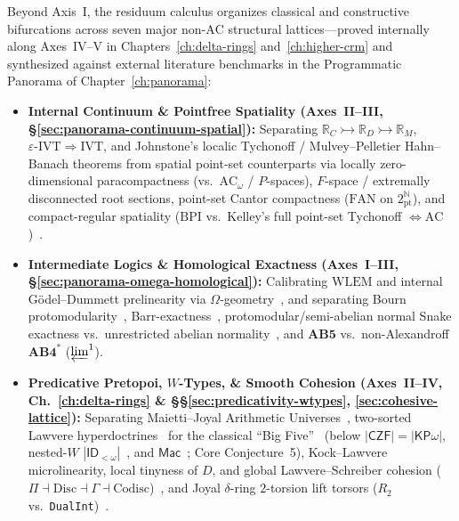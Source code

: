 \documentclass[10pt,twoside,openright]{book}
\theoremstyle{crmplain}
\theoremstyle{crmdef}
\theoremstyle{crmremark}
\newcommand{\CohesiveQuad}{\Pi \dashv \mathrm{Disc} \dashv \Gamma \dashv \mathrm{Codisc}}
\begin{document}
Beyond Axis~I, the residuum calculus organizes classical and constructive bifurcations across seven major non-$\mathrm{AC}$ structural lattices---proved internally along Axes~IV--V in Chapters~\ref{ch:delta-rings} and~\ref{ch:higher-crm} and synthesized against external literature benchmarks in the Programmatic Panorama of Chapter~\ref{ch:panorama}:
\begin{itemize}[leftmargin=1.5em,noitemsep,topsep=2pt]
  \item \textbf{Internal Continuum \& Pointfree Spatiality (Axes~II--III, \S\ref{sec:panorama-continuum-spatial}):} Separating $\mathbb{R}_C \rightarrowtail \mathbb{R}_D \rightarrowtail \mathbb{R}_M$, $\varepsilon\text{-}\mathrm{IVT} \Rightarrow \mathrm{IVT}$, and Johnstone's localic Tychonoff / Mulvey--Pelletier Hahn--Banach theorems from spatial point-set counterparts via locally zero-dimensional paracompactness (vs.\ $\mathrm{AC}_\omega$ / $P$-spaces), $F$-space / extremally disconnected root sections, point-set Cantor compactness ($\mathrm{FAN}$ on $2^{\mathbb{N}}_{\mathrm{pt}}$), and compact-regular spatiality ($\mathrm{BPI}$ vs.\ Kelley's full point-set Tychonoff $\iff \mathrm{AC}$)~\cite{FourmanHyland79,Bishop67,Ishihara06,BridgesRichman87,Johnstone81,Johnstone82,MulveyPelletier91,Deligne72,Johnstone02}.
  \item \textbf{Intermediate Logics \& Homological Exactness (Axes~I--III, \S\ref{sec:panorama-omega-homological}):} Calibrating $\mathrm{WLEM}$ and internal G\"odel--Dummett prelinearity via $\Omega$-geometry~\cite{Johnstone82,Johnstone02}, and separating Bourn protomodularity~\cite{Bourn91}, Barr-exactness~\cite[\S\S A1.3--A1.4]{Johnstone02}, protomodular/semi-abelian normal Snake exactness vs.\ unrestricted abelian normality~\cite{JMT02,MacLane98}, and $\mathbf{AB5}$ vs.\ non-Alexandroff $\mathbf{AB4}^*$ ($\varprojlim^1$).
  \item \textbf{Predicative Pretopoi, $W$-Types, \& Smooth Cohesion (Axes~II--IV, Ch.~\ref{ch:delta-rings} \& \S\S\ref{sec:predicativity-wtypes}, \ref{sec:cohesive-lattice}):} Separating Maietti--Joyal Arithmetic Universes~\cite{Maietti05}, two-sorted Lawvere hyperdoctrines~\cite{Lawvere69} for the classical ``Big Five''~\cite{Friedman75,Simpson09} (below $|\mathsf{CZF}| = |\mathsf{KP}\omega|$, nested-$W$ $|\mathsf{ID}_{<\omega}|$~\cite{Aczel78}, and $\mathsf{Mac}$~\cite{Cole73}; Core Conjecture~5), Kock--Lawvere microlinearity, local tinyness of $D$, and global Lawvere--Schreiber cohesion ($\CohesiveQuad$)~\cite{Kock06,MoerdijkReyes91,Diaconescu75,Lawvere07,Schreiber13}, and Joyal $\delta$-ring $2$-torsion lift torsors ($R_2$ vs.\ \texttt{DualInt})~\cite{Joyal85}.

\end{itemize}
\end{document}
